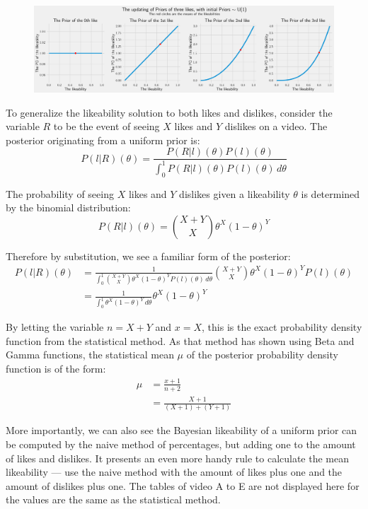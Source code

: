 \documentclass[a4paper,11pt]{article}
\begin{document}
\begin{figure}[H]
    \centering
    \includegraphics[width=\textwidth]{assets/updating_priors.png}
    \caption{}
    \label{fig:up}
\end{figure}

To generalize the likeability solution to both likes and dislikes, consider the variable $R$ to be the event of seeing $X$ likes and $Y$ dislikes on a video. The posterior originating from a uniform prior is:
\[
    P(l|R)(\theta) = \frac{P(R|l)(\theta) P(l)(\theta)}{\int_0^1 P(R|l)(\theta) P(l)(\theta) \, d\theta}
\]

The probability of seeing $X$ likes and $Y$ dislikes given a likeability $\theta$ is determined by the binomial distribution:
\[
    P(R|l)(\theta) = {X+Y \choose X} \theta^X (1-\theta)^Y
\]

Therefore by substitution, we see a familiar form of the posterior:
\begin{align*}
    P(l|R)(\theta) &= \frac{1}{\int_0^1 {X+Y \choose X} \theta^X (1-\theta)^Y P(l)(\theta)\,d\theta}{X+Y \choose X} \theta^X (1-\theta)^Y P(l)(\theta)\\
    &= \frac{1}{\int_0^1 \theta^X (1-\theta)^Y \,d\theta} \theta^X (1-\theta)^Y
\end{align*}

By letting the variable $n=X+Y$ and $x=X$, this is the exact probability density function from the statistical method. As that method has shown using Beta and Gamma functions, the statistical mean $\mu$ of the posterior probability density function is of the form:
\begin{align*}
    \mu &= \frac{x+1}{n+2}\\
    &= \frac{X+1}{(X+1) + (Y+1)}
\end{align*}

More importantly, we can also see the Bayesian likeability of a uniform prior can be computed by the naive method of percentages, but adding one to the amount of likes and dislikes. It presents an even more handy rule to calculate the mean likeability --- use the naive method with the amount of likes plus one and the amount of dislikes plus one. The tables of video A to E are not displayed here for the values are the same as the statistical method.
\end{document}
